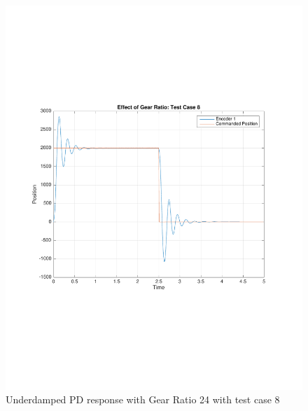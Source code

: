 \documentclass[11pt, a4paper]{article}
\begin{document}
\begin{figure}[H]
\centering
\includegraphics[width = \textwidth]{gr_tc8.pdf}
\caption{Underdamped PD response with Gear Ratio 24 with test case 8}
\end{figure}
\end{document}
